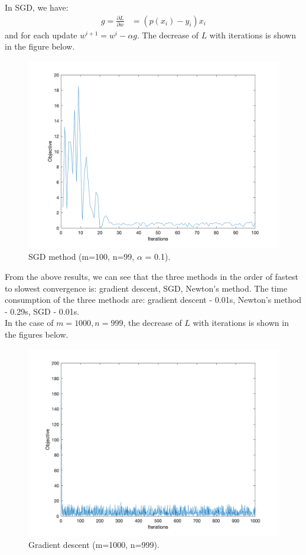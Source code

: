 \documentclass[11pt]{article}
\begin{document}
In SGD, we have:
\begin{equation}
	\begin{aligned}
		g=\frac{\partial L}{\partial w}&=(p(x_i)-y_i)x_i
	\end{aligned}
\end{equation}
and for each update $w^{i+1}=w^i-\alpha g$. The decrease of $L$ with iterations is shown in the figure below.
\begin{figure}[H] %
	\centering\includegraphics[width=0.6\linewidth]{fin_6 _99_sgd.png}
	\caption{SGD method (m=100, n=99, $\alpha$ = 0.1).} %
	\label{fig:fig0}  %
\end{figure}
From the above results, we can see that the three methods in the order of fastest to slowest convergence is: gradient descent, SGD, Newton's method.
The time consumption of the three methods are: gradient descent - 0.01s, Newton's method - 0.29s, SGD - 0.01s. \\
In the case of $m=1000, n=999$, the decrease of $L$ with iterations is shown in the figures below.
\begin{figure}[H] %
	\centering\includegraphics[width=0.6\linewidth]{fin_6_999_grd.png}
	\caption{Gradient descent (m=1000, n=999).} %
	\label{fig:fig6}  %
\end{figure}
\end{document}
